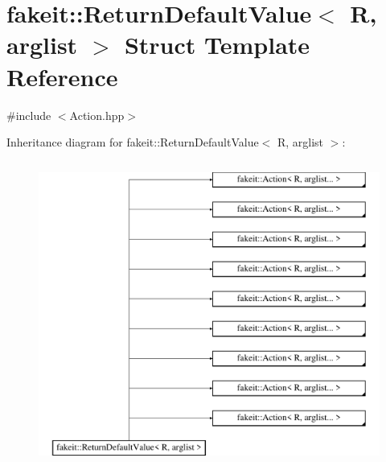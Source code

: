 \hypertarget{structfakeit_1_1ReturnDefaultValue}{}\section{fakeit\+::Return\+Default\+Value$<$ R, arglist $>$ Struct Template Reference}
\label{structfakeit_1_1ReturnDefaultValue}


{\ttfamily \#include $<$Action.\+hpp$>$}

Inheritance diagram for fakeit\+::Return\+Default\+Value$<$ R, arglist $>$\+:\begin{figure}[H]
\begin{center}
\leavevmode
\includegraphics[height=10.000000cm]{structfakeit_1_1ReturnDefaultValue}
\end{center}
\end{figure}
